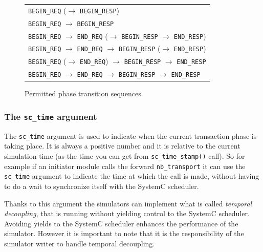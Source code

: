 {\begin{figure}[h]
	\begin{center}
\begin{tabular}{|l|}
\hline
\texttt{BEGIN\_REQ} {\footnotesize($\to$ \texttt{BEGIN\_RESP})}\\
\texttt{BEGIN\_REQ} $\to$ \texttt{BEGIN\_RESP}\\
\texttt{BEGIN\_REQ} $\to$ \texttt{END\_REQ} {\footnotesize($\to$ \texttt{BEGIN\_RESP} $\to$ \texttt{END\_RESP})}\\
\texttt{BEGIN\_REQ} $\to$ \texttt{END\_REQ} $\to$ \texttt{BEGIN\_RESP} {\footnotesize($\to$ \texttt{END\_RESP})}\\
\texttt{BEGIN\_REQ} {\small($\to$ \texttt{END\_REQ})} $\to$ \texttt{BEGIN\_RESP} $\to$ \texttt{END\_RESP}\\
\texttt{BEGIN\_REQ} $\to$ \texttt{END\_REQ} $\to$ \texttt{BEGIN\_RESP} $\to$ \texttt{END\_RESP}\\
\hline
\end{tabular}
	\end{center}
	\caption{Permitted phase transition sequences.}
	\label{fig:tlm_phase_sequences}
\end{figure}

\subsubsection{The \texttt{sc\_time} argument}
The \texttt{sc\_time} argument is used to indicate when the current transaction phase is taking place.
It is always a positive number and it is relative to the current simulation time (as the time you can get from \texttt{sc\_time\_stamp()} call). 
So for example if an initiator module calls the forward \texttt{nb\_transport} it can use the \texttt{sc\_time} argument to indicate the time at which the call is made, without having to do a wait to synchronize itself with the SystemC scheduler.

Thanks to this argument the simulators can implement what is called \emph{temporal decoupling}, that is running without yielding control to the SystemC scheduler.
Avoiding yields to the SystemC scheduler enhances the performance of the simulator.
However it is important to note that it is the responsibility of the simulator writer to handle temporal decoupling.

}
